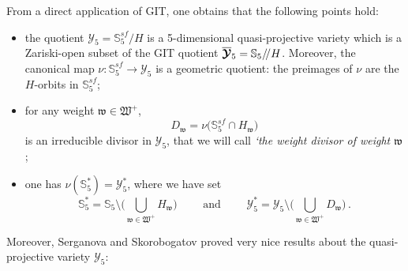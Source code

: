 \documentclass[11pt]{amsart}
\newcommand{\mk}{\medskip}
\begin{document}
From a direct application of GIT, one obtains that the following points hold:
\begin{itemize}
\item the quotient $\boldsymbol{\mathcal Y}_5=\boldsymbol{\mathbb S}^{sf}_5/H$ is a 5-dimensional quasi-projective variety which is a Zariski-open subset of the GIT quotient $\overline{\boldsymbol{\mathcal Y}}_5=\boldsymbol{\mathbb S}_5/\hspace{-0.07cm}/H$.
Moreover, the  canonical map $\nu : \boldsymbol{\mathbb S}^{sf}_5\rightarrow \boldsymbol{\mathcal Y}_5$ is a 
geometric quotient: the preimages of $\nu$ are the $H$-orbits in $\boldsymbol{\mathbb S}^{sf}_5$;
\mk 
\item  for any weight $\mathfrak w\in \mathfrak W^+$,  
\begin{equation}
\label{Eq:Dw}
D_\mathfrak w=\nu\Big( \mathbb S_5^{sf} \cap H_{\mathfrak w}
\Big)
\end{equation}
is an irreducible divisor in $\boldsymbol{\mathcal Y}_5$, that we will call {\it `the weight divisor of weight $\mathfrak w$}; 
\mk 
\item one has $\nu(  \mathbb S_5^*)=\boldsymbol{\mathcal Y}_5^*$, where we have set
$$ \mathbb S_5^*= \mathbb S_5\setminus \Big( 
\bigcup_{ \mathfrak w \in \mathfrak W^+} H_{\mathfrak w}
\Big)
\qquad 
\mbox{ and } 
\qquad  
\boldsymbol{\mathcal Y}_5^*=
\boldsymbol{\mathcal Y}_5
\setminus \Big( 
\bigcup_{ \mathfrak w \in \mathfrak W^+} D_{\mathfrak w}
\Big)\, .$$ 
\end{itemize}
Moreover, Serganova and Skorobogatov proved very nice results about the quasi-projective variety $\boldsymbol{\mathcal Y}_5$: 
\end{document}
